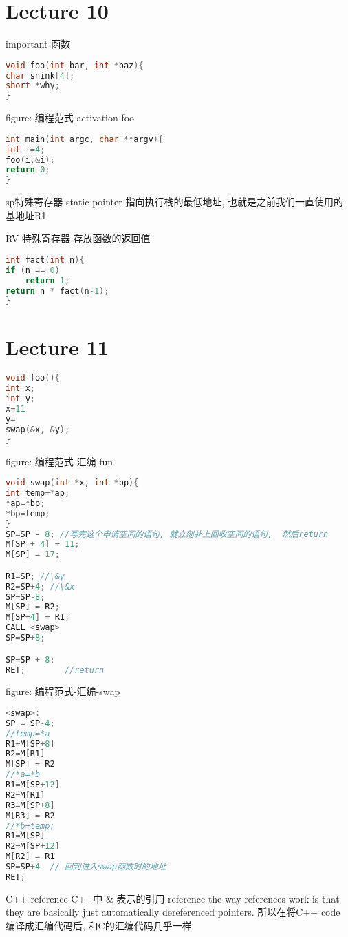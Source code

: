 \documentclass{article}
\begin{document}
\section{Lecture 10} important
函数
\begin{lstlisting}[language = C]
void foo(int bar, int *baz){
char snink[4];
short *why;
}
\end{lstlisting}
figure: 编程范式-activation-foo
 

\begin{lstlisting}[language = C]
int main(int argc, char **argv){
int i=4;
foo(i,&i);
return 0;
}
\end{lstlisting}

sp特殊寄存器
static pointer 指向执行栈的最低地址, 也就是之前我们一直使用的基地址R1

RV 特殊寄存器
存放函数的返回值

\begin{lstlisting}[language = C]
int fact(int n){
if (n == 0)
	return 1;
return n * fact(n-1);
}
\end{lstlisting}

\section{Lecture 11}
\begin{lstlisting}[language = C]
void foo(){
int x;
int y;
x=11
y=
swap(&x, &y);
}
\end{lstlisting}
figure: 编程范式-汇编-fun
 

\begin{lstlisting}[language = C]
void swap(int *x, int *bp){
int temp=*ap;
*ap=*bp;
*bp=temp;
}
SP=SP - 8; //写完这个申请空间的语句, 就立刻补上回收空间的语句,  然后return
M[SP + 4] = 11;
M[SP] = 17;

R1=SP; //\&y
R2=SP+4; //\&x
SP=SP-8;
M[SP] = R2;
M[SP+4] = R1;
CALL <swap>
SP=SP+8;

SP=SP + 8;  
RET;		//return
\end{lstlisting}

figure: 编程范式-汇编-swap
 
\begin{lstlisting}[language = C]
<swap>: 
SP = SP-4;
//temp=*a
R1=M[SP+8]
R2=M[R1]
M[SP] = R2
//*a=*b
R1=M[SP+12]
R2=M[R1]
R3=M[SP+8]
M[R3] = R2
//*b=temp;
R1=M[SP]
R2=M[SP+12]
M[R2] = R1
SP=SP+4  // 回到进入swap函数时的地址
RET;
\end{lstlisting}

C++ reference
C++中 \& 表示的引用 reference
the way references work is that they are basically just automatically dereferenced pointers.
所以在将C++ code 编译成汇编代码后, 和C的汇编代码几乎一样
\end{document}
